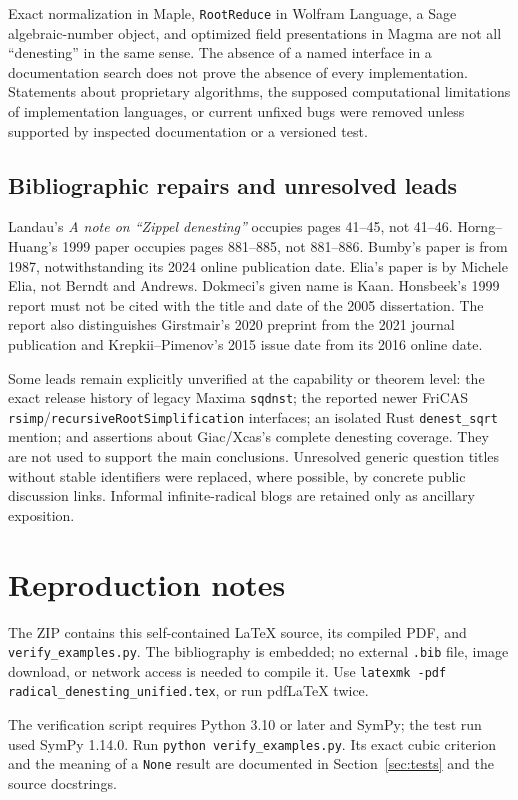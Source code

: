 \documentclass[11pt,a4paper]{article}
\numberwithin{equation}{section}
\theoremstyle{definition}\newtheorem{definition}[theorem]{Definition}
\theoremstyle{remark}\newtheorem{remark}[theorem]{Remark}
\begin{document}
Exact normalization in Maple, \texttt{RootReduce} in Wolfram Language, a Sage algebraic-number object, and optimized field presentations in Magma are not all ``denesting'' in the same sense. The absence of a named interface in a documentation search does not prove the absence of every implementation. Statements about proprietary algorithms, the supposed computational limitations of implementation languages, or current unfixed bugs were removed unless supported by inspected documentation or a versioned test.

\subsection{Bibliographic repairs and unresolved leads}
Landau's \emph{A note on ``Zippel denesting''} occupies pages 41--45, not 41--46. Horng--Huang's 1999 paper occupies pages 881--885, not 881--886. Bumby's paper is from 1987, notwithstanding its 2024 online publication date. Elia's paper is by Michele Elia, not Berndt and Andrews. Dokmeci's given name is Kaan. Honsbeek's 1999 report must not be cited with the title and date of the 2005 dissertation. The report also distinguishes Girstmair's 2020 preprint from the 2021 journal publication and Krepkii--Pimenov's 2015 issue date from its 2016 online date.

Some leads remain explicitly unverified at the capability or theorem level: the exact release history of legacy Maxima \texttt{sqdnst}; the reported newer FriCAS \texttt{rsimp}/\texttt{recursiveRootSimplification} interfaces; an isolated Rust \texttt{denest\_sqrt} mention; and assertions about Giac/Xcas's complete denesting coverage. They are not used to support the main conclusions. Unresolved generic question titles without stable identifiers were replaced, where possible, by concrete public discussion links. Informal infinite-radical blogs are retained only as ancillary exposition.

\section{Reproduction notes}
The ZIP contains this self-contained LaTeX source, its compiled PDF, and \texttt{verify\_examples.py}. The bibliography is embedded; no external \texttt{.bib} file, image download, or network access is needed to compile it. Use \texttt{latexmk -pdf radical\_denesting\_unified.tex}, or run pdfLaTeX twice.

The verification script requires Python 3.10 or later and SymPy; the test run used SymPy 1.14.0. Run \texttt{python verify\_examples.py}. Its exact cubic criterion and the meaning of a \texttt{None} result are documented in Section~\ref{sec:tests} and the source docstrings.
\end{document}
